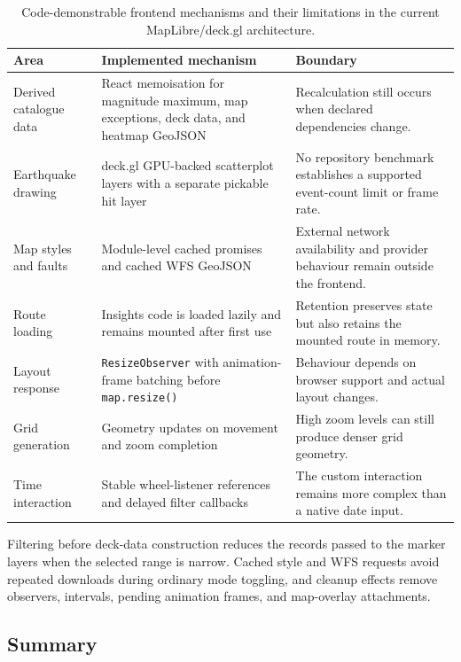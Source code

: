 \documentclass[12pt]{article}
\begin{document}
\begin{table}[H]
\centering
\caption{Code-demonstrable frontend mechanisms and their limitations in the current MapLibre/deck.gl architecture.}
\label{tab:frontend-current-mechanisms}
\small
\setlength{\tabcolsep}{3pt}
\begin{tabular}{
    >{\raggedright\arraybackslash}p{3.6cm}
    >{\raggedright\arraybackslash}p{5.0cm}
    >{\raggedright\arraybackslash}p{5.0cm}}
\toprule
\textbf{Area} & \textbf{Implemented mechanism} & \textbf{Boundary} \\
\midrule
Derived catalogue data & React memoisation for magnitude maximum, map exceptions, deck data, and heatmap GeoJSON & Recalculation still occurs when declared dependencies change. \\
Earthquake drawing & deck.gl GPU-backed scatterplot layers with a separate pickable hit layer & No repository benchmark establishes a supported event-count limit or frame rate. \\
Map styles and faults & Module-level cached promises and cached WFS GeoJSON & External network availability and provider behaviour remain outside the frontend. \\
Route loading & Insights code is loaded lazily and remains mounted after first use & Retention preserves state but also retains the mounted route in memory. \\
Layout response & \texttt{ResizeObserver} with animation-frame batching before \texttt{map.resize()} & Behaviour depends on browser support and actual layout changes. \\
Grid generation & Geometry updates on movement and zoom completion & High zoom levels can still produce denser grid geometry. \\
Time interaction & Stable wheel-listener references and delayed filter callbacks & The custom interaction remains more complex than a native date input. \\
\bottomrule
\end{tabular}
\end{table}

Filtering before deck-data construction reduces the records passed to the marker layers when the selected range is narrow. Cached style and WFS requests avoid repeated downloads during ordinary mode toggling, and cleanup effects remove observers, intervals, pending animation frames, and map-overlay attachments.

\subsection{Summary}
\label{subsec:frontend_summary}
\end{document}
